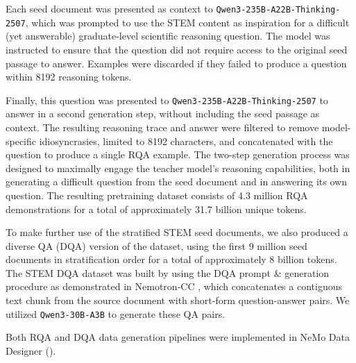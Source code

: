 Each seed document was presented as context to \texttt{Qwen3-235B-A22B-Thinking-2507}, which was prompted to use the STEM content as inspiration for a difficult (yet answerable) graduate-level scientific reasoning question. The model was instructed to ensure that the question did not require access to the original seed passage to answer. Examples were discarded if they failed to produce a question within 8192 reasoning tokens.

Finally, this question was presented to \texttt{Qwen3-235B-A22B-Thinking-2507} to answer in a second generation step, without including the seed passage as context. The resulting reasoning trace and answer were filtered to remove model-specific idiosyncrasies, limited to 8192 characters, and concatenated with the question to produce a single RQA example. The two-step generation process was designed to maximally engage the teacher model's reasoning capabilities, both in generating a difficult question from the seed document and in answering its own question. The resulting pretraining dataset consists of 4.3 million RQA demonstrations for a total of approximately 31.7 billion unique tokens. 

To make further use of the stratified STEM seed documents, we also produced a diverse QA (DQA) version of the dataset, using the first 9 million seed documents in stratification order for a total of approximately 8 billion tokens. The STEM DQA dataset was built by using the DQA prompt \& generation procedure as demonstrated in Nemotron-CC \citep{su2024nemotroncctransformingcommoncrawl}, which concatenates a contiguous text chunk from the source document with short-form question-answer pairs. We utilized \texttt{Qwen3-30B-A3B} to generate these QA pairs.

Both RQA and DQA data generation pipelines were implemented in NeMo Data Designer (\cite{nemo-data-designer}).

